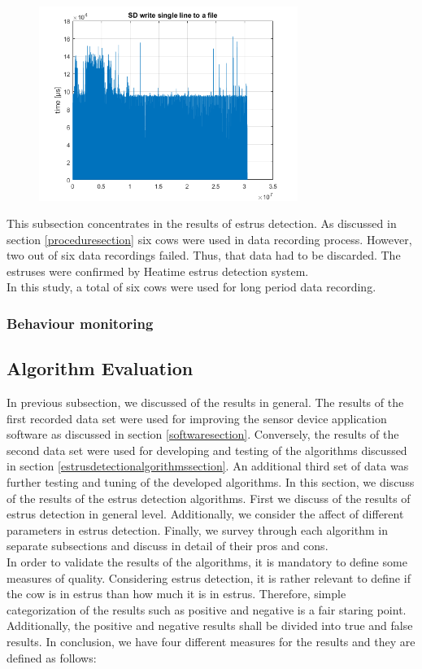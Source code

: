 \documentclass[english,12pt,a4paper,pdftex,elec,utf8]{aaltothesis}
\begin{document}
\begin{figure}[h]
\centering
\includegraphics[width = 0.75\textwidth]{figures/writetimes_vanharauta.png}
\caption{} \label{writetimes_old}
\end{figure}


This subsection concentrates in the results of estrus detection. As discussed in section \ref{proceduresection} six cows were used in data recording process. However, two out of six data recordings failed. Thus, that data had to be discarded. The estruses were confirmed by Heatime estrus detection system. \\
In this study, a total of six cows were used for long period data recording.

\subsubsection{Behaviour monitoring}

\subsection{Algorithm Evaluation} \label{algorithmevaluationsection}

In previous subsection, we discussed of the results in general. The results of the first recorded data set were used for improving the sensor device application software as discussed in section \ref{softwaresection}. Conversely, the results of the second data set were used for developing and testing of the algorithms discussed in section \ref{estrusdetectionalgorithmssection}. An additional third set of data was further testing and tuning of the developed algorithms. In this section, we discuss of the results of the estrus detection algorithms. First we discuss of the results of estrus detection in general level. Additionally, we consider the affect of different parameters in estrus detection. Finally, we survey through each algorithm in separate subsections and discuss in detail of their pros and cons. \\
In order to validate the results of the algorithms, it is mandatory to define some measures of quality. Considering estrus detection, it is rather relevant to define if the cow is in estrus than how much it is in estrus. Therefore, simple categorization of the results such as positive and negative is a fair staring point. Additionally, the positive and negative results shall be divided into true and false results. In conclusion, we have four different measures for the results and they are defined as follows:
\end{document}
